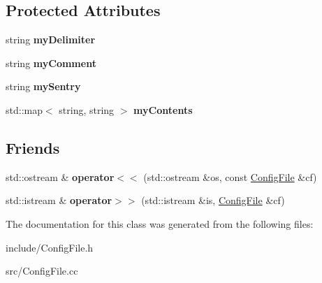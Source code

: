 \subsection*{Protected Attributes}
\begin{DoxyCompactItemize}
\item 
\hypertarget{classConfigFile_ad63f3e259f665192b64fb3e83c701425}{string {\bfseries my\+Delimiter}}\label{classConfigFile_ad63f3e259f665192b64fb3e83c701425}

\item 
\hypertarget{classConfigFile_a2c60a141e8ad012b86a0642ec8ec638d}{string {\bfseries my\+Comment}}\label{classConfigFile_a2c60a141e8ad012b86a0642ec8ec638d}

\item 
\hypertarget{classConfigFile_af066ec1942c50848a055350029ebbca5}{string {\bfseries my\+Sentry}}\label{classConfigFile_af066ec1942c50848a055350029ebbca5}

\item 
\hypertarget{classConfigFile_a91b9b9e241d42bd3b1bb8b3e6355761f}{std\+::map$<$ string, string $>$ {\bfseries my\+Contents}}\label{classConfigFile_a91b9b9e241d42bd3b1bb8b3e6355761f}

\end{DoxyCompactItemize}
\subsection*{Friends}
\begin{DoxyCompactItemize}
\item 
\hypertarget{classConfigFile_a8ccacbc37db1992a5515e2c72fc83ce6}{std\+::ostream \& {\bfseries operator$<$$<$} (std\+::ostream \&os, const \hyperlink{classConfigFile}{Config\+File} \&cf)}\label{classConfigFile_a8ccacbc37db1992a5515e2c72fc83ce6}

\item 
\hypertarget{classConfigFile_a25042475439039e70f90febe7d0e63ec}{std\+::istream \& {\bfseries operator$>$$>$} (std\+::istream \&is, \hyperlink{classConfigFile}{Config\+File} \&cf)}\label{classConfigFile_a25042475439039e70f90febe7d0e63ec}

\end{DoxyCompactItemize}


The documentation for this class was generated from the following files\+:\begin{DoxyCompactItemize}
\item 
include/Config\+File.\+h\item 
src/Config\+File.\+cc\end{DoxyCompactItemize}
